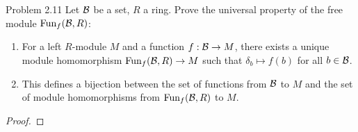 \documentclass[a4paper]{article}
\begin{document}
\begin{ex}{Problem 2.11}{} Let $\mathcal{B}$ be a set, $R$ a ring. Prove the universal property of the free module $\text{Fun}_f(\mathcal{B},R)$:
\begin{enumerate}
\item For a left $R$-module $M$ and a function $f:\mathcal{B}\to M$, there exists a unique module homomorphism $\text{Fun}_f(\mathcal{B},R)\to M$ such that $\delta_b\mapsto f(b)$ for all $b\in\mathcal{B}$. 
\item This defines a bijection between the set of functions from $\mathcal{B}$ to $M$ and the set of module homomorphisms from $\text{Fun}_f(\mathcal{B},R)$ to $M$. 
\end{enumerate} \tcbline
\begin{proof}
\end{proof}
\end{ex}
\end{document}
